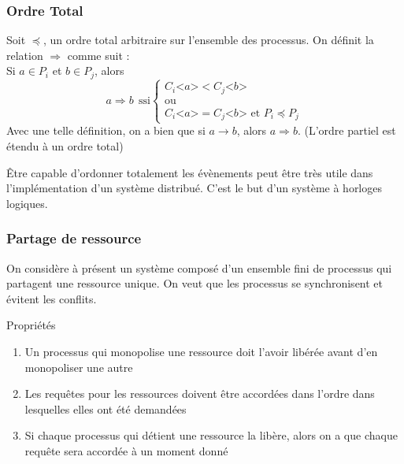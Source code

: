 \documentclass[compress]{beamer}
\begin{document}
\begin{frame}
\frametitle{Ordre Total}
Soit $\preceq$, un ordre total arbitraire sur l'ensemble des processus. On définit la relation $\Rightarrow$ comme suit :\\
Si $a \in P_i$ et $b \in P_j$, alors \\
\[
	a \Rightarrow b \ \ \text{ssi}
	\begin{cases}
		C_i \text{<}a\text{>} < C_j\text{<}b\text{>} \\
		\text{ou}\\
		C_i\text{<}a\text{>} = C_j\text{<}b\text{>} \text{ et } P_i \preceq P_j
	\end{cases}
\]
Avec une telle définition, on a bien que si $a \rightarrow b$, alors $a \Rightarrow b$. (L'ordre partiel est étendu à un ordre total)
\vspace{.5in}

\^Etre capable d'ordonner totalement les évènements peut être très utile dans l'implémentation d'un système distribué. C'est le but d'un système à horloges logiques.
\end{frame}

\begin{frame}
\frametitle{Partage de ressource}
On considère à présent un système composé d'un ensemble fini de processus qui partagent une ressource unique. On veut que les processus se synchronisent et évitent les conflits.
\begin{block}{Propriétés}
\begin{enumerate}
\item Un processus qui monopolise une ressource doit l'avoir libérée avant d'en monopoliser une autre
\item Les requêtes pour les ressources doivent être accordées dans l'ordre dans lesquelles elles ont été demandées
\item Si chaque processus qui détient une ressource la libère, alors on a que chaque requête sera accordée à un moment donné
\end{enumerate}
\end{block}
\end{frame}
\end{document}
